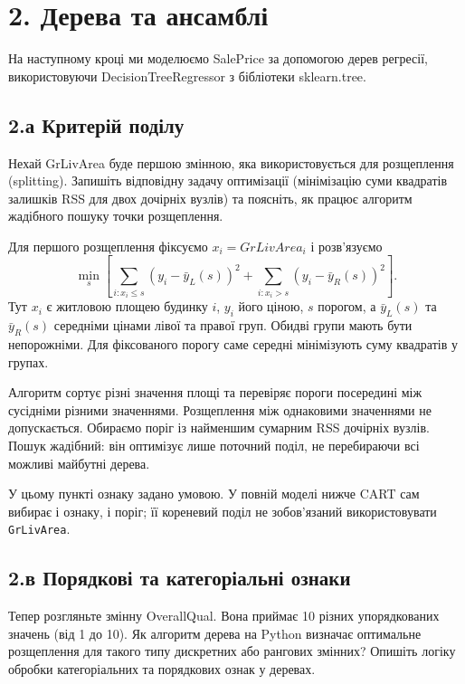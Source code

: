 \section{2. Дерева та ансамблі}


На наступному кроці ми моделюємо SalePrice за допомогою дерев регресії,
використовуючи DecisionTreeRegressor з бібліотеки sklearn.tree.


\Needspace{167pt}

\subsection{2.а Критерій поділу}

\begin{taskstatement}Нехай GrLivArea буде першою змінною, яка використовується для
розщеплення (splitting). Запишіть відповідну задачу оптимізації
(мінімізацію суми квадратів залишків RSS для двох дочірніх вузлів) та
поясніть, як працює алгоритм жадібного пошуку точки розщеплення.
\end{taskstatement}

\par\medskip
Для першого розщеплення фіксуємо \(x_i=GrLivArea_i\) і розв'язуємо
\[\min_s\left[\sum_{i:x_i\le s}(y_i-\bar y_L(s))^2+\sum_{i:x_i>s}(y_i-\bar y_R(s))^2\right].\]
Тут \(x_i\) є житловою площею будинку \(i\), \(y_i\) його ціною, \(s\)
порогом, а \(\bar y_L(s)\) та \(\bar y_R(s)\) середніми цінами лівої та
правої груп. Обидві групи мають бути непорожніми. Для фіксованого порогу
саме середні мінімізують суму квадратів у групах.

Алгоритм сортує різні значення площі та перевіряє пороги посередині між
сусідніми різними значеннями. Розщеплення між однаковими значеннями не
допускається. Обираємо поріг із найменшим сумарним RSS дочірніх вузлів.
Пошук жадібний: він оптимізує лише поточний поділ, не перебираючи всі
можливі майбутні дерева.

У цьому пункті ознаку задано умовою. У повній моделі нижче CART сам
вибирає і ознаку, і поріг; її кореневий поділ не зобов'язаний
використовувати \texttt{GrLivArea}.


\Needspace{277pt}

\subsection{2.в Порядкові та категоріальні ознаки}

\begin{taskstatement}Тепер розгляньте змінну OverallQual. Вона приймає 10 різних
упорядкованих значень (від 1 до 10). Як алгоритм дерева на Python
визначає оптимальне розщеплення для такого типу дискретних або рангових
змінних? Опишіть логіку обробки категоріальних та порядкових ознак у
деревах.
\end{taskstatement}

